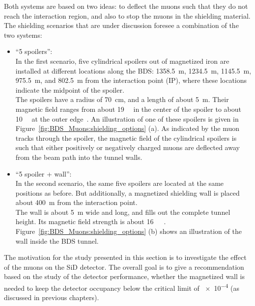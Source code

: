 Both systems are based on two ideas: to deflect the muons such that they do not reach the interaction region, and also to stop the muons in the shielding material.
The shielding scenarios that are under discussion foresee a combination of the two systems:
\begin{itemize}
 \item ``5 spoilers'':\\
 In the first scenario, five cylindrical spoilers out of magnetized iron are installed at different locations along the BDS: \SI{1358.5}{\metre}, \SI{1234.5}{\metre}, \SI{1145.5}{\metre}, \SI{975.5}{\metre}, and \SI{802.5}{\metre} from the interaction point (IP), where these locations indicate the midpoint of the spoiler.
 \\The spoilers have a radius of \SI{70}{\centi\meter}, and a length of about \SI{5}{\meter}.
 Their magnetic field ranges from about \SI{19}{\kilo\gauss} in the center of the spoiler to about \SI{10}{\kilo\gauss} at the outer edge~\cite{MuonShielding,Lewis}.
 An illustration of one of these spoilers is given in Figure~\ref{fig:BDS_Muons:shielding_options} (a).
 As indicated by the muon tracks through the spoiler, the magnetic field of the cylindrical spoilers is such that either positively or negatively charged muons are deflected away from the beam path into the tunnel walls.
 \item ``5 spoiler + wall'':\\
 In the second scenario, the same five spoilers are located at the same positions as before.
 But additionally, a magnetized shielding wall is placed about \SI{400}{\meter} from the interaction point.
 \\The wall is about \SI{5}{\meter} wide and long, and fills out the complete tunnel height.
 Its magnetic field strength is about \SI{16}{\kilo\gauss}~\cite{MuonShielding,Lewis}.
 Figure~\ref{fig:BDS_Muons:shielding_options} (b) shows an illustration of the wall inside the BDS tunnel.
\end{itemize}
The motivation for the study presented in this section is to investigate the effect of the muons on the SiD detector.
The overall goal is to give a recommendation based on the study of the detector performance, whether the magnetized wall is needed to keep the detector occupancy below the critical limit of \num{e-4} (as discussed in previous chapters).
